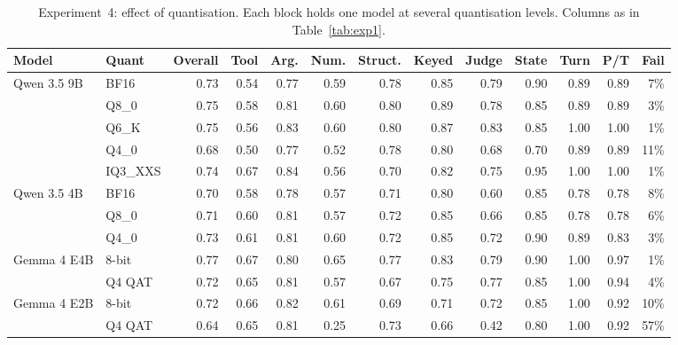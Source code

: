\begin{table}[!t]
\centering
\caption{Experiment~4: effect of quantisation. Each block holds one model at several quantisation levels. Columns as in Table~\ref{tab:exp1}.}
\label{tab:exp3}
\small
\setlength{\tabcolsep}{4pt}
\begin{tabular}{@{}ll rrrrrrrrrrr@{}}
\toprule
Model & Quant & Overall & Tool & Arg. & Num. & Struct. & Keyed & Judge & State & Turn & P/T & Fail \\
\midrule
Qwen 3.5 9B & BF16 & 0.73 & 0.54 & 0.77 & 0.59 & 0.78 & 0.85 & 0.79 & 0.90 & 0.89 & 0.89 & 7\% \\
 & Q8\_0 & 0.75 & 0.58 & 0.81 & 0.60 & 0.80 & 0.89 & 0.78 & 0.85 & 0.89 & 0.89 & 3\% \\
 & Q6\_K & 0.75 & 0.56 & 0.83 & 0.60 & 0.80 & 0.87 & 0.83 & 0.85 & 1.00 & 1.00 & 1\% \\
 & Q4\_0 & 0.68 & 0.50 & 0.77 & 0.52 & 0.78 & 0.80 & 0.68 & 0.70 & 0.89 & 0.89 & 11\% \\
 & IQ3\_XXS & 0.74 & 0.67 & 0.84 & 0.56 & 0.70 & 0.82 & 0.75 & 0.95 & 1.00 & 1.00 & 1\% \\
\midrule
Qwen 3.5 4B & BF16 & 0.70 & 0.58 & 0.78 & 0.57 & 0.71 & 0.80 & 0.60 & 0.85 & 0.78 & 0.78 & 8\% \\
 & Q8\_0 & 0.71 & 0.60 & 0.81 & 0.57 & 0.72 & 0.85 & 0.66 & 0.85 & 0.78 & 0.78 & 6\% \\
 & Q4\_0 & 0.73 & 0.61 & 0.81 & 0.60 & 0.72 & 0.85 & 0.72 & 0.90 & 0.89 & 0.83 & 3\% \\
\midrule
Gemma 4 E4B & 8-bit & 0.77 & 0.67 & 0.80 & 0.65 & 0.77 & 0.83 & 0.79 & 0.90 & 1.00 & 0.97 & 1\% \\
 & Q4 QAT & 0.72 & 0.65 & 0.81 & 0.57 & 0.67 & 0.75 & 0.77 & 0.85 & 1.00 & 0.94 & 4\% \\
\midrule
Gemma 4 E2B & 8-bit & 0.72 & 0.66 & 0.82 & 0.61 & 0.69 & 0.71 & 0.72 & 0.85 & 1.00 & 0.92 & 10\% \\
 & Q4 QAT & 0.64 & 0.65 & 0.81 & 0.25 & 0.73 & 0.66 & 0.42 & 0.80 & 1.00 & 0.92 & 57\% \\
\bottomrule
\end{tabular}
\end{table}
